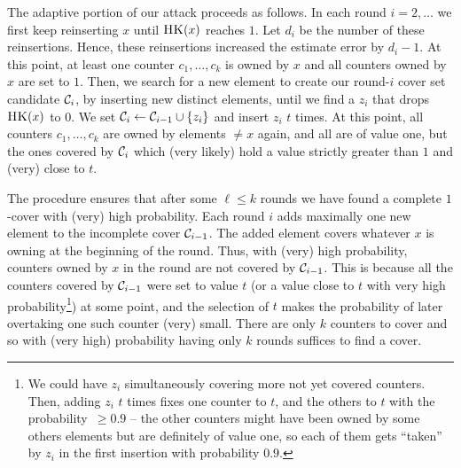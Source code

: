 The adaptive portion of our attack proceeds as follows. In each round $i = 2, \dots$ we
first keep reinserting $x$ until $\textnormal{\textsc{HK}}(x)$ reaches $1$. 
Let $d_i$ be the number of these reinsertions.  Hence, these reinsertions increased the estimate error by $d_i - 1$. At this point, at least one counter $c_1, \dots, c_k$ is owned by $x$ and all counters owned by $x$ are  set to $1$. Then, 
we search for a new element to create our round-$i$ cover set candidate $\mathcal{C}_i$, by inserting new distinct elements, until we find a $z_i$ that drops $\textnormal{\textsc{HK}}(x)$ to $0$.
We set $\mathcal{C}_i \gets \mathcal{C}_{i-1} \cup \{z_i\}$ and insert $z_i$ $t$ times. At this point, all counters $c_1, \dots, c_k$ are owned by elements $\neq x$ again, and all are of value one, but the ones covered by $\mathcal{C}_i$ which (very 
likely)  hold a value strictly greater than $1$ and (very) close to $t$. 

The procedure ensures that after some $\ell \leq k$ rounds we have found a complete $1$-cover with (very) high probability.
Each round $i$ adds maximally one new element to the incomplete cover $\mathcal{C}_{i-1}$. The added element covers whatever $x$ is owning at the beginning of the round. Thus, with (very) high probability, counters owned by $x$ in the round are not covered by $\mathcal{C}_{i-1}$. This is because all the counters covered by $\mathcal{C}_{i-1}$ were set to value $t$ (or a value close to $t$ with very high probability\footnote{We could have $z_i$ simultaneously covering more not yet covered counters. Then, adding $z_i$ $t$ times fixes one counter to $t$, and the others to $t$ with the probability~$ \geq 0.9$ -- the other counters might have been owned by some others elements but are definitely of value one, so each of them gets ``taken'' by $z_i$ in the first insertion with probability $0.9$.}) at some point, and the selection of $t$ makes the probability of later overtaking one such counter (very) small. There are only $k$ counters to cover and so with (very high) probability having only $k$ rounds suffices to find a cover.

